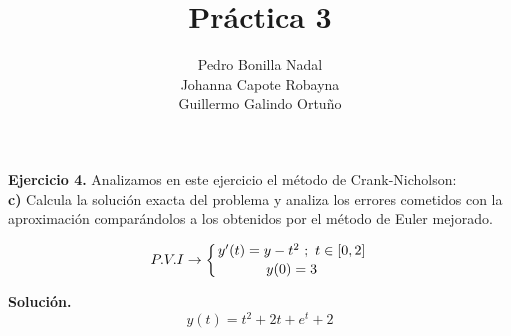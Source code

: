 \documentclass[11pt]{article}
\title{\textbf{Práctica 3}}
\author{Pedro Bonilla Nadal\\
		Johanna Capote Robayna\\
		Guillermo Galindo Ortuño}
\date{}
\begin{document}
\maketitle

\textbf{Ejercicio 4.} Analizamos en este ejercicio el método de Crank-Nicholson: \\

\textbf{c)} Calcula la solución exacta del problema y analiza los errores cometidos con la aproximación comparándolos a los obtenidos por el método de Euler mejorado.

$$P.V.I  \rightarrow  \left\lbrace
y'(t) = y - t^2 \  ;\  t \in [0,2] \atop
y(0) = 3
\right. $$

\textbf{Solución.}
$$y(t) = t^2 + 2 t + e^t + 2$$
\end{document}
